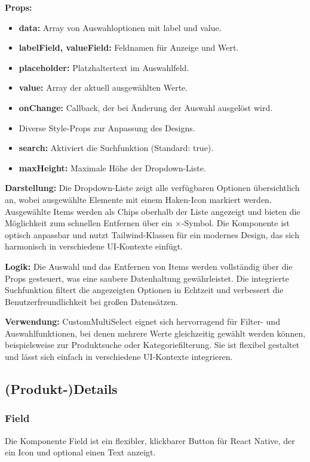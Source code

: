 \textbf{Props:}
\begin{itemize}
    \item \textbf{data:} Array von Auswahloptionen mit label und value.
    \item \textbf{labelField, valueField:} Feldnamen für Anzeige und Wert.
    \item \textbf{placeholder:} Platzhaltertext im Auswahlfeld.
    \item \textbf{value:} Array der aktuell ausgewählten Werte.
    \item \textbf{onChange:} Callback, der bei Änderung der Auswahl ausgelöst wird.
    \item Diverse Style-Props zur Anpassung des Designs.
    \item \textbf{search:} Aktiviert die Suchfunktion (Standard: true).
    \item \textbf{maxHeight:} Maximale Höhe der Dropdown-Liste.
\end{itemize}

\textbf{Darstellung:}
Die Dropdown-Liste zeigt alle verfügbaren Optionen übersichtlich an, wobei ausgewählte Elemente mit einem Haken-Icon markiert werden. Ausgewählte Items werden als Chips oberhalb der Liste angezeigt und bieten die Möglichkeit zum schnellen Entfernen über ein ×-Symbol. Die Komponente ist optisch anpassbar und nutzt Tailwind-Klassen für ein modernes Design, das sich harmonisch in verschiedene UI-Kontexte einfügt.

\textbf{Logik:}
Die Auswahl und das Entfernen von Items werden vollständig über die Props gesteuert, was eine saubere Datenhaltung gewährleistet. Die integrierte Suchfunktion filtert die angezeigten Optionen in Echtzeit und verbessert die Benutzerfreundlichkeit bei großen Datensätzen.

\noindent\textbf{Verwendung:} CustomMultiSelect eignet sich hervorragend für Filter- und Auswahlfunktionen, bei denen mehrere Werte gleichzeitig gewählt werden können, beispielsweise zur Produktsuche oder Kategoriefilterung. Sie ist flexibel gestaltet und lässt sich einfach in verschiedene UI-Kontexte integrieren.

\subsection{(Produkt-)Details}

\subsubsection{Field}
Die Komponente Field ist ein flexibler, klickbarer Button für React Native, der ein Icon und optional einen Text anzeigt.


